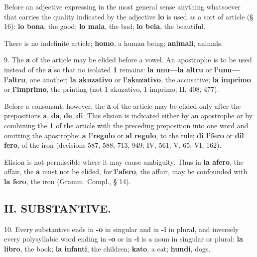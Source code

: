 Before an adjective expressing in the most general sense anything whatsoever that carries the quality indicated by the adjective \textbf{lo} is used as a sort of article (§ 16): \textbf{lo bona}, the good; \textbf{lo mala}, the bad; \textbf{lo bela}, the beautiful. 

There is no indefinite article; \textbf{homo}, a human being; \textbf{animali}, animals. 

9. The \textbf{a} of the article may be elided before a vowel. An apostrophe is to be used instead of the \textbf{a} so that no isolated \textbf{1} remains: \textbf{la unu—la altru} or \textbf{l'unu—l'altru}, one another; \textbf{la akuzativo} or \textbf{l'akuzativo}, the accusative; \textbf{la imprimo} or \textbf{l'imprimo}, the printing (not 1 akuzativo, 1 imprimo; II, 408, 477). 

Before a consonant, however, the \textbf{a} of the article may be elided only after the prepositions \textbf{a}, \textbf{da}, \textbf{de}, \textbf{di}. This elision is indicated either by an apostrophe or by combining the \textbf{1} of the article with the preceding preposition into one word and omitting the apostrophe: \textbf{a l'regulo} or \textbf{al regulo}, to the rule; \textbf{di l'fero} or \textbf{dil fero}, of the iron (decisions 587, 588, 713, 949; IV, 561; V, 65; VI, 162). 

Elision is not permissible where it may cause ambiguity. Thus in \textbf{la afero}, the affair, the \textbf{a} must not be elided, for \textbf{l'afero}, the affair, may be confounded with \textbf{la fero}, the iron (Gramm. Compl., § 14).

\subsection*{II. SUBSTANTIVE.}
10. Every substantive ends in \textbf{-o} in singular and in \textbf{-i} in plural, and inversely every polysyllabic word ending in \textbf{-o} or in \textbf{-i} is a noun in singular or plural: \textbf{la libro}, the book; \textbf{la infanti}, the children; \textbf{kato}, a cat; \textbf{hundi}, dogs.\footnotemark[1]

